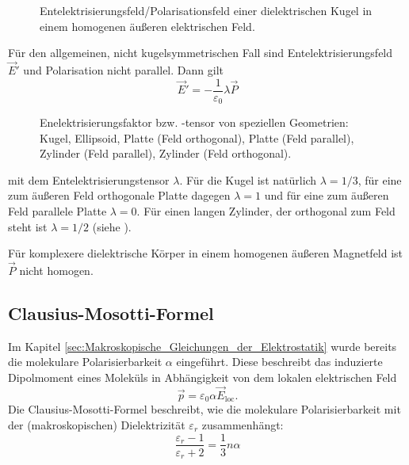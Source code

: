 \begin{figure}[htb]
	\centering
	\tfigEntelektrisierung
	\caption{Entelektrisierungsfeld/Polarisationsfeld einer dielektrischen Kugel in einem homogenen äußeren elektrischen Feld. }
	\label{fig:dielectric_ball_polarisation_field}
\end{figure}


Für den allgemeinen, nicht kugelsymmetrischen Fall sind Entelektrisierungsfeld $\vec {E}'$ und Polarisation nicht parallel. Dann gilt
\begin{equation*}
	\vec {E}'=-\frac{1}{\varepsilon _{0}}\lambda \vec {P}
\end{equation*}


\begin{figure}[htb]
	\centering
	\tfigSimpleDielectricBodiesEntelektrisierungsfeld
	\caption{Enelektrisierungsfaktor bzw. -tensor von speziellen Geometrien: Kugel, Ellipsoid, Platte (Feld orthogonal), Platte (Feld parallel), Zylinder (Feld parallel), Zylinder (Feld orthogonal). }
	\label{fig:simple_dielectric_bodies_polarisation_field}
\end{figure}

mit dem Entelektrisierungstensor $\lambda$. Für die Kugel ist natürlich $\lambda =1/3$, für eine zum äußeren Feld orthogonale Platte dagegen $\lambda =1$ und für eine zum äußeren Feld parallele Platte $\lambda =0$. Für einen langen Zylinder, der orthogonal zum Feld steht ist $\lambda =1/2$ (siehe ).

Für komplexere dielektrische Körper in einem homogenen äußeren Magnetfeld ist $\vec {P}$ nicht homogen.



\subsection{Clausius-Mosotti-Formel}

Im Kapitel \ref{sec:Makroskopische_Gleichungen_der_Elektrostatik} wurde bereits die molekulare Polarisierbarkeit $\alpha $ eingeführt. Diese beschreibt das induzierte Dipolmoment eines Moleküls in Abhängigkeit von dem lokalen elektrischen Feld
\begin{equation*}
	\vec {p}=\varepsilon _{0}\alpha \vec {E}_{\mathrm{loc}}.
\end{equation*}
Die Clausius-Mosotti-Formel beschreibt, wie die molekulare Polarisierbarkeit mit der (makroskopischen) Dielektrizität $\varepsilon _{r}$ zusammenhängt:
\begin{equation*}
	\frac{\varepsilon _{r}-1}{\varepsilon _{r}+2}=\frac{1}{3}n\alpha
\end{equation*}


